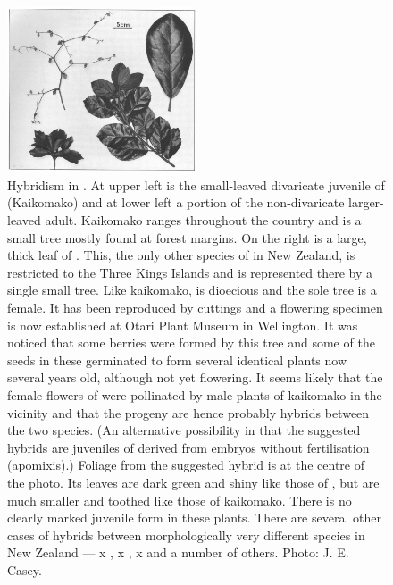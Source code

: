 \begin{figure}
	\includegraphics[width=0.5\textwidth]{graphics/figure79pennantia.jpg}
	\centering
	\caption[Hybridism in Pennantia]{Hybridism in .
    At upper left is the small-leaved divaricate juvenile of  (Kaikomako) and at lower left a portion of the non-divaricate larger-leaved adult.
    Kaikomako ranges throughout the country and is a small tree mostly found at forest margins.
    On the right is a large, thick leaf of .
    This, the only other species of  in New Zealand, is restricted to the Three Kings Islands and is represented there by a single small tree.
    Like kaikomako,  is dioecious and the sole tree is a female.
    It has been reproduced by cuttings and a flowering specimen is now established at Otari Plant Museum in Wellington.
    It was noticed that some berries were formed by this tree and some of the seeds in these germinated to form several identical plants now several years old, although not yet flowering.
    It seems likely that the female flowers of  were pollinated by male plants of kaikomako in the vicinity and that the progeny are hence probably hybrids between the two species. (An alternative possibility in that the suggested hybrids are juveniles of  derived from embryos without fertilisation (apomixis).) Foliage from the suggested hybrid is at the centre of the photo.
    Its leaves are dark green and shiny like those of , but are much smaller and toothed like those of kaikomako.
    There is no clearly marked juvenile form in these plants.
    There are several other cases of hybrids between morphologically very different species in New Zealand —  x ,  x ,  x  and a number of others.
    Photo:  J. E. Casey.}
	\label{fig:79pennantia}
\end{figure}

